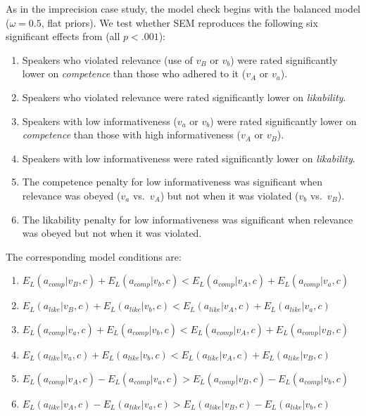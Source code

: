 \documentclass[12pt,a4paper]{article}
\begin{document}
As in the imprecision case study, the model check begins with the balanced model
($\omega = 0.5$, flat priors). We test whether SEM reproduces the following six
significant effects from \citet{beltramapapafragou2023} (all $p < .001$):

\begin{enumerate}
\item Speakers who violated relevance (use of $v_B$ or $v_b$) were rated
significantly lower on \emph{competence} than those who adhered to it ($v_A$ or
$v_a$).

\item Speakers who violated relevance were rated significantly lower on
\emph{likability}.

\item Speakers with low informativeness ($v_a$ or $v_b$) were rated
significantly lower on \emph{competence} than those with high informativeness
($v_A$ or $v_B$).

\item Speakers with low informativeness were rated significantly lower on
\emph{likability}.

\item The competence penalty for low informativeness was significant when
relevance was obeyed ($v_a$ vs.~$v_A$) but not when it was violated ($v_b$
vs.~$v_B$).

\item The likability penalty for low informativeness was significant when
relevance was obeyed but not when it was violated.
\end{enumerate}

\noindent The corresponding model conditions are:

\begin{enumerate}
\item $E_L(a_{comp}|v_B, c) + E_L(a_{comp}|v_b, c) < E_L(a_{comp}|v_A, c) + E_L(a_{comp}|v_a, c)$
\item $E_L(a_{like}|v_B, c) + E_L(a_{like}|v_b, c) < E_L(a_{like}|v_A, c) + E_L(a_{like}|v_a, c)$
\item $E_L(a_{comp}|v_a, c) + E_L(a_{comp}|v_b, c) < E_L(a_{comp}|v_A, c) + E_L(a_{comp}|v_B, c)$
\item $E_L(a_{like}|v_a, c) + E_L(a_{like}|v_b, c) < E_L(a_{like}|v_A, c) + E_L(a_{like}|v_B, c)$
\item $E_L(a_{comp}|v_A, c) - E_L(a_{comp}|v_a, c) > E_L(a_{comp}|v_B, c) - E_L(a_{comp}|v_b, c)$
\item $E_L(a_{like}|v_A, c) - E_L(a_{like}|v_a, c) > E_L(a_{like}|v_B, c) - E_L(a_{like}|v_b, c)$
\end{enumerate}
\end{document}
